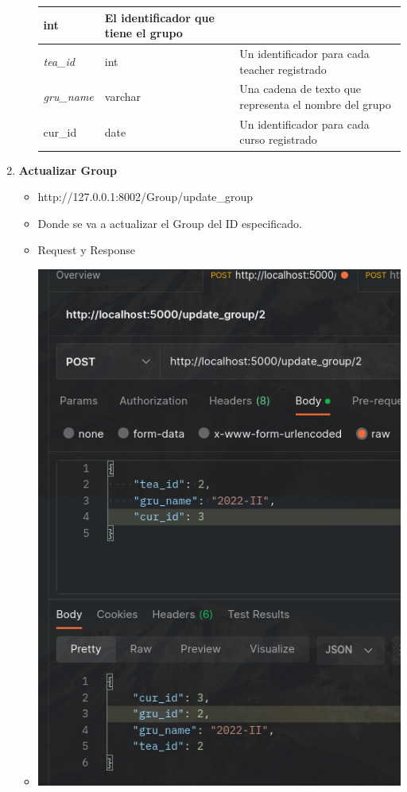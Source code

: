 \documentclass{article}
\begin{document}
\begin{enumerate}
\begin{itemize}
\begin{table}[H]
\begin{tabular}{|l|l|l|}
        int & El identificador que tiene el grupo \\ \hline \textit{tea\_id} &
        int & Un identificador para cada teacher registrado \\ \hline
        \textit{gru\_name} & varchar & Una cadena de texto que representa el
        nombre del grupo \\ \hline cur\_id & date & Un identificador para cada
        curso registrado \\ \hline \end{tabular} \end{table}
    \end{itemize}

    \item \textbf{Actualizar Group}
    \begin{itemize}
        \item http://127.0.0.1:8002/Group/update\_group
        \item Donde se va a actualizar el Group del ID especificado.
        \item Request y Response
        \item \includegraphics[scale=.5]{assets/group/update.png}

\end{itemize}
\end{enumerate}
\end{document}
